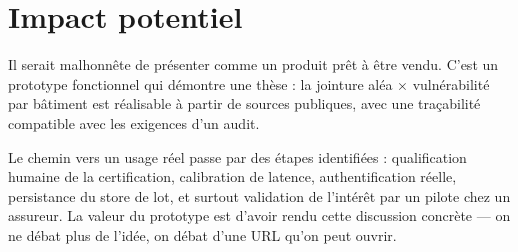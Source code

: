 \section{Impact potentiel}

Il serait malhonnête de présenter \typhoon{} comme un produit prêt à être
vendu. C'est un prototype fonctionnel qui démontre une thèse : la jointure
aléa $\times$ vulnérabilité par bâtiment est réalisable à partir de sources
publiques, avec une traçabilité compatible avec les exigences d'un audit.

Le chemin vers un usage réel passe par des étapes identifiées : qualification
humaine de la certification, calibration de latence, authentification réelle,
persistance du store de lot, et surtout validation de l'intérêt par un pilote
chez un assureur. La valeur du prototype est d'avoir rendu cette discussion
concrète — on ne débat plus de l'idée, on débat d'une URL qu'on peut ouvrir.
